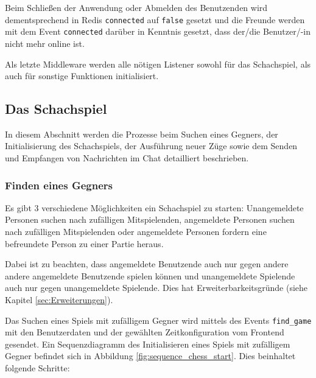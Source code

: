 Beim Schließen der Anwendung oder Abmelden des Benutzenden wird dementsprechend in Redis \verb|connected| auf \verb|false| gesetzt und die Freunde werden mit dem Event \verb|connected| darüber in Kenntnis gesetzt, dass der/die Benutzer/-in nicht mehr online ist.

Als letzte Middleware werden alle nötigen Listener sowohl für das Schachspiel, als auch für sonstige Funktionen initialisiert.
\subsection{Das Schachspiel}
\label{sec:Schach-Backend}
In diesem Abschnitt werden die Prozesse beim Suchen eines Gegners, der Initialisierung des Schachspiels, der Ausführung neuer Züge sowie dem Senden und Empfangen von Nachrichten im Chat detailliert beschrieben.
\subsubsection{Finden eines Gegners}
\label{sec:find_game}
Es gibt 3 verschiedene Möglichkeiten ein Schachspiel zu starten: Unangemeldete Personen suchen nach zufälligen Mitspielenden, angemeldete Personen suchen nach zufälligen Mitspielenden oder angemeldete Personen fordern eine befreundete Person zu einer Partie heraus.

Dabei ist zu beachten, dass angemeldete Benutzende auch nur gegen andere andere angemeldete Benutzende spielen können und unangemeldete Spielende auch nur gegen unangemeldete Spielende. Dies hat Erweiterbarkeitsgründe (siehe Kapitel \ref{sec:Erweiterungen}).

Das Suchen eines Spiels mit zufälligem Gegner wird mittels des Events \verb|find_game| mit den Benutzerdaten und der gewählten Zeitkonfiguration vom Frontend gesendet. Ein Sequenzdiagramm des Initialisieren eines Spiels mit zufälligem Gegner befindet sich in Abbildung \ref{fig:sequence_chess_start}. Dies beinhaltet folgende Schritte:
     
